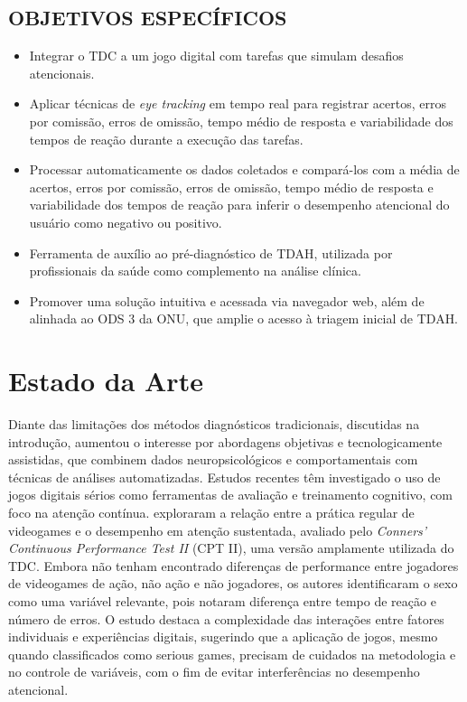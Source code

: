 \documentclass[11pt,a4paper]{article}
\begin{document}
\subsection*{OBJETIVOS ESPECÍFICOS} 

\begin{itemize}
    \item Integrar o TDC a um jogo digital com tarefas que
    simulam desafios atencionais.
    \item  Aplicar técnicas de \textit{eye tracking} em tempo real para registrar acertos, erros por comissão, erros de omissão, tempo médio de resposta e variabilidade dos tempos de reação durante a execução das tarefas.
    \item Processar automaticamente os dados coletados e compará-los com a média de acertos, erros por comissão, erros de omissão, tempo médio de resposta e variabilidade dos tempos de reação para inferir o desempenho atencional do usuário como negativo ou positivo.
    \item Ferramenta de auxílio ao pré-diagnóstico de TDAH, utilizada por profissionais da saúde como complemento na análise clínica.
    \item Promover uma solução intuitiva e acessada via navegador web, além de alinhada ao ODS 3 da ONU, que amplie
    o acesso à triagem inicial de TDAH.
\end{itemize}


\section{Estado da Arte}

Diante das limitações dos métodos diagnósticos tradicionais, discutidas na introdução, aumentou o interesse por abordagens objetivas e tecnologicamente assistidas, que combinem dados neuropsicológicos e comportamentais com técnicas de análises automatizadas. Estudos recentes
têm investigado o uso de jogos digitais sérios como ferramentas de avaliação e treinamento
cognitivo, com foco na atenção contínua. \cite{Nascimento2020} exploraram a relação
entre a prática regular de videogames e o desempenho em atenção sustentada, avaliado
pelo \textit{Conners’ Continuous Performance Test II} (CPT II), uma versão amplamente utilizada do
TDC. Embora não tenham encontrado diferenças de
performance entre jogadores de videogames de ação, não ação e não jogadores, os autores
identificaram o sexo como uma variável relevante, pois notaram diferença entre tempo de
reação e número de erros. O estudo destaca a complexidade das interações entre fatores
individuais e experiências digitais, sugerindo que a aplicação de jogos, mesmo quando
classificados como serious games, precisam de cuidados na metodologia e no controle de
variáveis, com o fim de evitar interferências no desempenho atencional.
\end{document}
